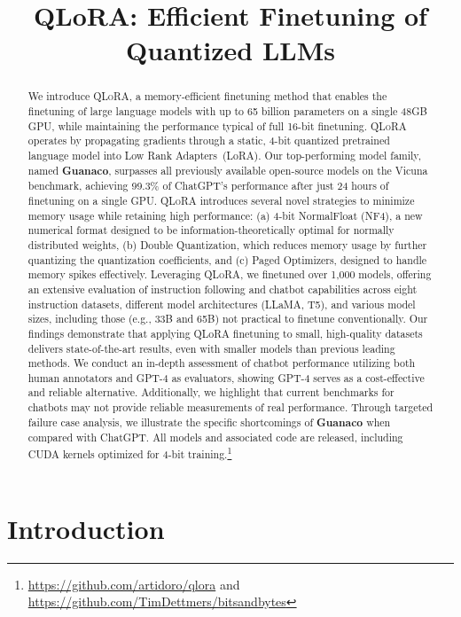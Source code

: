 \title{QLoRA: Efficient Finetuning of Quantized LLMs}

\begin{abstract}
We introduce \textsc{QLoRA}, a memory-efficient finetuning method that enables the finetuning of large language models with up to 65 billion parameters on a single 48GB GPU, while maintaining the performance typical of full 16-bit finetuning. \textsc{QLoRA} operates by propagating gradients through a static, 4-bit quantized pretrained language model into Low Rank Adapters~(LoRA). Our top-performing model family, named \textbf{Guanaco}, surpasses all previously available open-source models on the Vicuna benchmark, achieving 99.3\% of ChatGPT's performance after just 24 hours of finetuning on a single GPU. \textsc{QLoRA} introduces several novel strategies to minimize memory usage while retaining high performance: (a) 4-bit NormalFloat (NF4), a new numerical format designed to be information-theoretically optimal for normally distributed weights, (b) Double Quantization, which reduces memory usage by further quantizing the quantization coefficients, and (c) Paged Optimizers, designed to handle memory spikes effectively. Leveraging \textsc{QLoRA}, we finetuned over 1,000 models, offering an extensive evaluation of instruction following and chatbot capabilities across eight instruction datasets, different model architectures (LLaMA, T5), and various model sizes, including those (e.g., 33B and 65B) not practical to finetune conventionally. Our findings demonstrate that applying QLoRA finetuning to small, high-quality datasets delivers state-of-the-art results, even with smaller models than previous leading methods. We conduct an in-depth assessment of chatbot performance utilizing both human annotators and GPT-4 as evaluators, showing GPT-4 serves as a cost-effective and reliable alternative. Additionally, we highlight that current benchmarks for chatbots may not provide reliable measurements of real performance. Through targeted failure case analysis, we illustrate the specific shortcomings of \textbf{Guanaco} when compared with ChatGPT. All models and associated code are released, including CUDA kernels optimized for 4-bit training.\footnote{\url{https://github.com/artidoro/qlora} and \url{https://github.com/TimDettmers/bitsandbytes}}
\end{abstract}

\section{Introduction}

